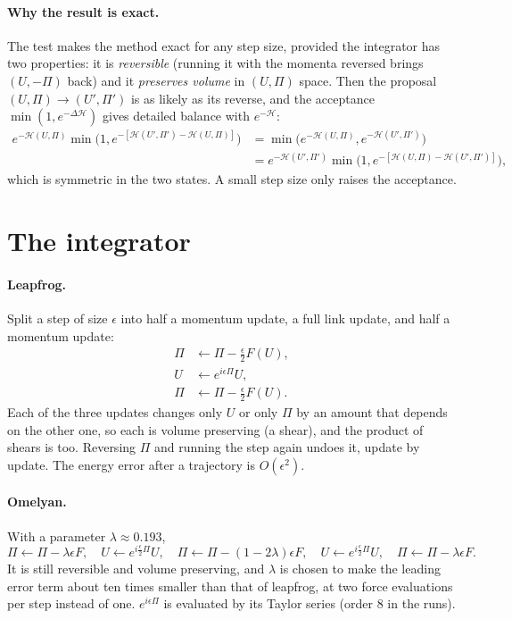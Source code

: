 \documentclass[11pt,a4paper]{article}
\numberwithin{equation}{section}
\begin{document}
\paragraph{Why the result is exact.} The test makes the method exact for any step size, provided
the integrator has two properties: it is \emph{reversible} (running it with the momenta reversed
brings $(U,-\Pi)$ back) and it \emph{preserves volume} in $(U,\Pi)$ space. Then the proposal
$(U,\Pi)\to(U',\Pi')$ is as likely as its reverse, and the acceptance $\min(1,e^{-\Delta\mathcal H})$
gives detailed balance with $e^{-\mathcal H}$:
\begin{align}
e^{-\mathcal H(U,\Pi)}\min\big(1,e^{-[\mathcal H(U',\Pi')-\mathcal H(U,\Pi)]}\big)
&=\min\big(e^{-\mathcal H(U,\Pi)},e^{-\mathcal H(U',\Pi')}\big)\nonumber\\
&=e^{-\mathcal H(U',\Pi')}\min\big(1,e^{-[\mathcal H(U,\Pi)-\mathcal H(U',\Pi')]}\big),
\end{align}
which is symmetric in the two states. A small step size only raises the acceptance.

\section{The integrator}
\paragraph{Leapfrog.} Split a step of size $\epsilon$ into half a momentum update, a full link
update, and half a momentum update:
\begin{align}
\Pi&\leftarrow\Pi-\tfrac\epsilon2F(U),\nonumber\\
U&\leftarrow e^{i\epsilon\Pi}U,\nonumber\\
\Pi&\leftarrow\Pi-\tfrac\epsilon2F(U).
\end{align}
Each of the three updates changes only $U$ or only $\Pi$ by an amount that depends on the other
one, so each is volume preserving (a shear), and the product of shears is too. Reversing $\Pi$
and running the step again undoes it, update by update. The energy error after a trajectory is
$O(\epsilon^2)$.

\paragraph{Omelyan.} With a parameter $\lambda\approx0.193$,
\begin{equation}
\Pi\leftarrow\Pi-\lambda\epsilon F,\quad U\leftarrow e^{i\frac\epsilon2\Pi}U,\quad
\Pi\leftarrow\Pi-(1-2\lambda)\epsilon F,\quad U\leftarrow e^{i\frac\epsilon2\Pi}U,\quad
\Pi\leftarrow\Pi-\lambda\epsilon F .
\end{equation}
It is still reversible and volume preserving, and $\lambda$ is chosen to make the leading error
term about ten times smaller than that of leapfrog, at two force evaluations per step instead of
one. $e^{i\epsilon\Pi}$ is evaluated by its Taylor series (order 8 in the runs).
\end{document}

